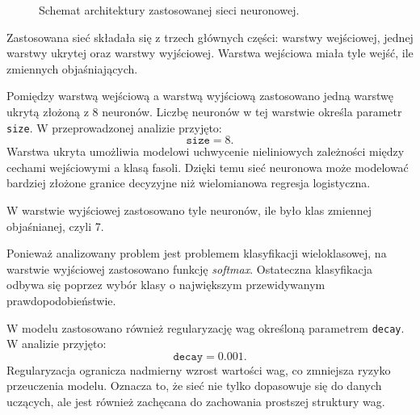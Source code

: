 \documentclass{report}
\begin{document}
\begin{figure}[H]
\caption{Schemat architektury zastosowanej sieci neuronowej.}
\label{fig:siec-neuronowa}
\end{figure}


Zastosowana sieć składała się z trzech głównych części: warstwy wejściowej, jednej warstwy ukrytej oraz warstwy wyjściowej. Warstwa wejściowa miała tyle wejść, ile zmiennych objaśniających. 

Pomiędzy warstwą wejściową a warstwą wyjściową zastosowano jedną warstwę ukrytą złożoną z 8 neuronów. Liczbę neuronów w tej warstwie określa parametr \texttt{size}. W przeprowadzonej analizie przyjęto:
\[
\texttt{size} = 8.
\]
Warstwa ukryta umożliwia modelowi uchwycenie nieliniowych zależności między cechami wejściowymi a klasą fasoli. Dzięki temu sieć neuronowa może modelować bardziej złożone granice decyzyjne niż wielomianowa regresja logistyczna.


W warstwie wyjściowej zastosowano tyle neuronów, ile było klas zmiennej objaśnianej, czyli 7. 


Ponieważ analizowany problem jest problemem klasyfikacji wieloklasowej, na warstwie wyjściowej zastosowano funkcję \textit{softmax}. Ostateczna klasyfikacja odbywa się poprzez wybór klasy o największym przewidywanym prawdopodobieństwie.


W modelu zastosowano również regularyzację wag określoną parametrem \texttt{decay}. W analizie przyjęto:
\[
\texttt{decay} = 0.001.
\]
Regularyzacja ogranicza nadmierny wzrost wartości wag, co zmniejsza ryzyko przeuczenia modelu. Oznacza to, że sieć nie tylko dopasowuje się do danych uczących, ale jest również zachęcana do zachowania prostszej struktury wag.
\end{document}
